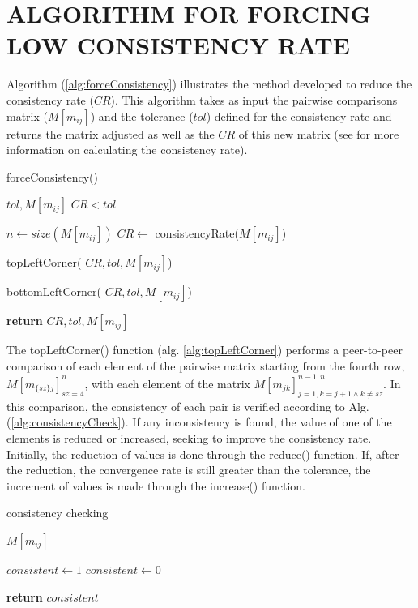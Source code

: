 \documentclass[10pt,fleqn,a4paper,twoside]{article}
\begin{document}
    \section{ALGORITHM FOR FORCING LOW CONSISTENCY RATE}
    
    Algorithm (\ref{alg:forceConsistency}) illustrates the method developed to reduce the consistency rate ($CR$). This algorithm takes as input the pairwise comparisons matrix ($M[m_{ij}]$) and the tolerance ($tol$) defined for the consistency rate and returns the matrix adjusted as well as the $CR$ of this new matrix (see \cite{Saaty1987} for more information on calculating the consistency rate).
    
\begin{algorithm}
\caption{forceConsistency()}\label{alg:forceConsistency}
	\begin{algorithmic}
	\Require $tol, M[m_{ij}]$
	\Ensure $CR < tol$
		
	\State $n \gets size(M[m_{ij}])$
	\State $CR \gets$ consistencyRate($M[m_{ij}]$)
	
	\State topLeftCorner( $CR, tol, M[m_{ij}]$)
	
	\State bottomLeftCorner( $CR, tol, M[m_{ij}]$)
	
	\State \textbf{return} $CR, tol, M[m_{ij}]$
	
\end{algorithmic}
\end{algorithm}

The topLeftCorner() function (alg. \ref{alg:topLeftCorner}) performs a peer-to-peer comparison of each element of the pairwise matrix starting from the fourth row, $M[m_{\{sz\}j}]_{sz=4}^{n}$, with each element of the matrix $M[m_{jk}]_{j=1, k=j+1 \land k \neq sz}^{n-1,n}$. In this comparison, the consistency of each pair is verified according to Alg. (\ref{alg:consistencyCheck}). If any inconsistency is found, the value of one of the elements is reduced or increased, seeking to improve the consistency rate. Initially, the reduction of values is done through the reduce() function.  If, after the reduction, the convergence rate is still greater than the tolerance, the increment of values is made through the increase() function.

\begin{algorithm}
\caption{consistency checking}\label{alg:consistencyCheck}
	\begin{algorithmic}
	\Require $M[m_{ij}]$
	
		\State $consistent \gets 1$ 
	\Else
		\State $consistent \gets 0$ 
	\EndIf
	
	\State \textbf{return} $consistent$
	
\end{algorithmic}
\end{algorithm}
\end{document}
